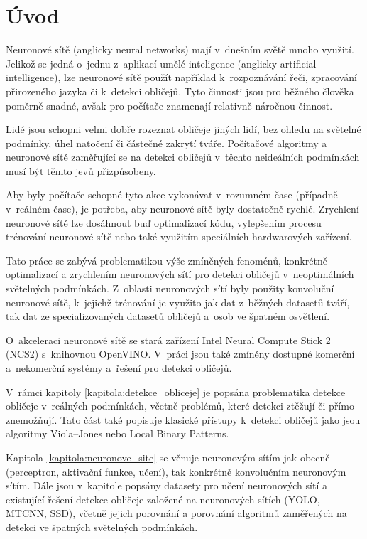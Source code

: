 \chapter{Úvod}
\label{kapitola:uvod}
Neuronové sítě (anglicky neural networks) mají v~dnešním světě mnoho využití. Jelikož se jedná o~jednu z~aplikací umělé inteligence (anglicky artificial intelligence), lze neuronové sítě použít například k~rozpoznávání řeči, zpracování přirozeného jazyka či k~detekci obličejů.
Tyto činnosti jsou pro běžného člověka poměrně snadné, avšak pro počítače znamenají relativně náročnou činnost.

Lidé jsou schopni velmi dobře rozeznat obličeje jiných lidí, bez ohledu na světelné podmínky, úhel natočení či částečné zakrytí tváře. Počítačové algoritmy a neuronové sítě zaměřující se na detekci obličejů v~těchto neideálních podmínkách musí být těmto jevů přizpůsobeny.

Aby byly počítače schopné tyto akce vykonávat v~rozumném čase (případně v~reálném čase), je potřeba, aby neuronové sítě byly dostatečně rychlé. Zrychlení neuronové sítě lze dosáhnout buď optimalizací kódu, vylepšením procesu trénování neuronové sítě nebo také využitím speciálních hardwarových zařízení. 

Tato práce se zabývá problematikou výše zmíněných fenoménů, konkrétně optimalizací a zrychlením neuronových sítí pro detekci obličejů v~neoptimálních světelných podmínkách. Z~oblasti neuronových sítí byly použity konvoluční neuronové sítě, k~jejichž trénování je využito jak dat z~běžných datasetů tváří, tak dat ze specializovaných datasetů obličejů a~osob ve špatném osvětlení. 

O~akceleraci neuronové sítě se stará zařízení Intel Neural Compute Stick 2 (NCS2) s~knihovnou OpenVINO. V~práci jsou také zmíněny dostupné komerční a~nekomerční systémy a~řešení pro detekci obličejů.

V~rámci kapitoly \ref{kapitola:detekce_obliceje} je popsána problematika detekce obličeje v~reálných podmínkách, včetně problémů, které detekci ztěžují či přímo znemožňují. Tato část také popisuje klasické přístupy k~detekci obličejů jako jsou algoritmy Viola--Jones nebo Local Binary Patterns.

Kapitola \ref{kapitola:neuronove_site} se věnuje neuronovým sítím jak obecně (perceptron, aktivační funkce, učení), tak konkrétně konvolučním neuronovým sítím. Dále jsou v~kapitole popsány datasety pro učení neuronových sítí a existující řešení detekce obličeje založené na neuronových sítích (YOLO, MTCNN, SSD), včetně jejich porovnání a porovnání algoritmů zaměřených na detekci ve špatných světelných podmínkách.

